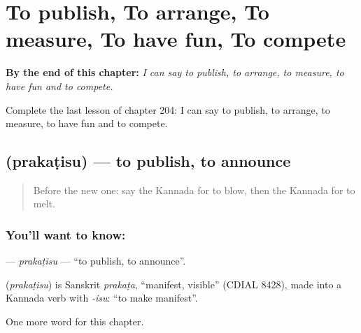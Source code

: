 
\chapter{To publish, To arrange, To measure, To have fun, To compete}
\label{ch:ka-to-publish-to-arrange-to-measure-to-have-fun-to-compete}

\begin{chapteropening}
\textbf{By the end of this chapter:} \emph{I can say to publish, to arrange, to measure, to have fun and to compete.}

Complete the last lesson of chapter 204: I can say to publish, to arrange, to measure, to have fun and to compete.
\end{chapteropening}

\section[\texorpdfstring{\kn{ಪ್ರಕಟಿಸು} (prakaṭisu)}{ಪ್ರಕಟಿಸು (prakaṭisu)}]{ (prakaṭisu) — to publish, to announce}

\label{lesson:KA-C204-prakatisu}



\begin{quote}
Before the new one: say the Kannada for to blow, then the Kannada for to melt.
\end{quote}

\subsection*{You'll want to know: }
\textbf{} — \emph{prakaṭisu} — \textquotedblleft{}to publish, to announce\textquotedblright{}.

\begin{cousinweb}
\textbf{} (\emph{prakaṭisu}) is Sanskrit \emph{prakaṭa}, \textquotedblleft{}manifest, visible\textquotedblright{} (CDIAL 8428), made into a Kannada verb with \emph{-isu}: \textquotedblleft{}to make manifest\textquotedblright{}.
\end{cousinweb}

\begin{grammarlens}[title={What you've built}]
One more word for this chapter.
\end{grammarlens}


